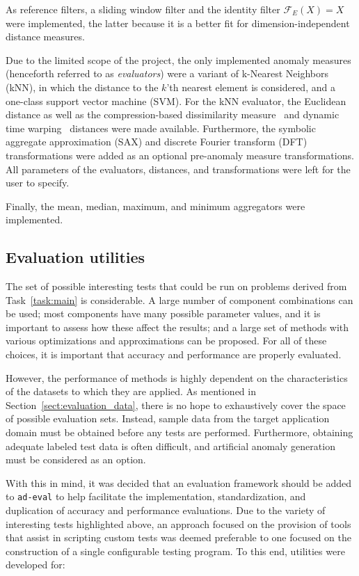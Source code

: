 As reference filters, a sliding window filter and the identity filter $\mathcal{F}_E(X)=X$ were implemented, the latter because it is a better fit for dimension-independent distance measures.

Due to the limited scope of the project, the only implemented anomaly measures (henceforth referred to as \emph{evaluators}) were a variant of k-Nearest Neighbors (kNN), in which the distance to the $k$'th nearest element is considered, and a one-class support vector machine (SVM). For the kNN evaluator, the Euclidean distance as well as the compression-based dissimilarity measure~\cite{keogh2} and dynamic time warping~\cite{dtw} distances were made available. Furthermore, the symbolic aggregate approximation (SAX) and discrete Fourier transform (DFT) transformations were added as an optional pre-anomaly measure transformations. All parameters of the evaluators, distances, and transformations were left for the user to specify.


Finally, the mean, median, maximum, and minimum aggregators were implemented.

\subsection{Evaluation utilities}
\label{sect:evaluation_package}

The set of possible interesting tests that could be run on problems derived from Task~\ref{task:main} is considerable. A large number of component combinations can be used; most components have many possible parameter values, and it is important to assess how these affect the results; and a large set of methods with various optimizations and approximations can be proposed. For all of these choices, it is important that accuracy and performance are properly evaluated.

However, the performance of methods is highly dependent on the characteristics of the datasets to which they are applied. As mentioned in Section~\ref{sect:evaluation_data}, there is no hope to exhaustively cover the space of possible evaluation sets. Instead, sample data from the target application domain must be obtained before any tests are performed. Furthermore, obtaining adequate labeled test data is often difficult, and artificial anomaly generation must be considered as an option.

With this in mind, it was decided that an evaluation framework should be added to \texttt{ad-eval} to help facilitate the implementation, standardization, and duplication of accuracy and performance evaluations. Due to the variety of interesting tests highlighted above, an approach focused on the provision of tools that assist in scripting custom tests was deemed preferable to one focused on the construction of a single configurable testing program. To this end, utilities were developed for:

